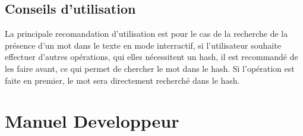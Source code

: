 \documentclass[french, 12pt, titlepage]{article}
\begin{document}
\begin{lstlisting}

\end{lstlisting}

\subsection{Conseils d'utilisation}
La principale recomandation d'utilisation est pour le cas de la
recherche de la présence d'un mot dans le texte en mode interractif,
si l'utilisateur souhaite effectuer d'autres opérations, qui elles
nécessitent un hash, il est recommandé de les faire avant, ce qui
permet de chercher le mot dans le hash. Si l'opération est faite en
premier, le mot sera directement recherché dans le hash.

\section{Manuel Developpeur}
\end{document}
